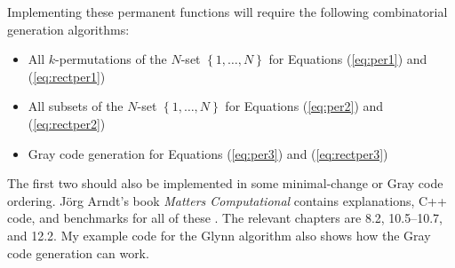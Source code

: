\documentclass{article}
\begin{document}
Implementing these permanent functions will require the following combinatorial generation
algorithms:
\begin{itemize}
    \item All $k$-permutations of the $N$-set $\left\{1,\dots,N\right\}$
          for Equations (\ref{eq:per1}) and (\ref{eq:rectper1})
    \item All subsets of the $N$-set $\left\{1,\dots,N\right\}$ for Equations (\ref{eq:per2}) and
          (\ref{eq:rectper2})
    \item Gray code generation for Equations (\ref{eq:per3}) and (\ref{eq:rectper3})
\end{itemize}
The first two should also be implemented in some minimal-change or Gray code ordering.  J\"{o}rg
Arndt's book \emph{Matters Computational} contains explanations, C++ code, and benchmarks for all of
these \cite{arndt2010}. The relevant chapters are 8.2, 10.5--10.7, and 12.2. My example code for the
Glynn algorithm also shows how the Gray code generation can work.



\end{document}
